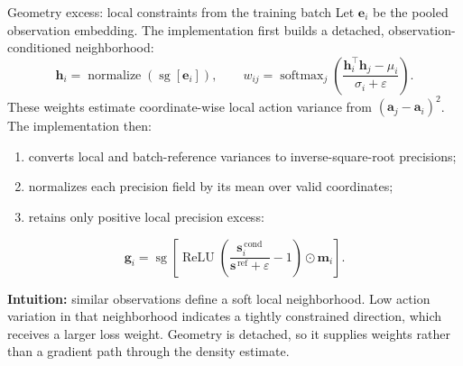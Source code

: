 \documentclass[aspectratio=169,10pt]{beamer}
\newcommand{\vect}[1]{\mathbf{#1}}
\newcommand{\sg}[1]{\operatorname{sg}\!\left[#1\right]}
\begin{document}
\begin{frame}{Geometry excess: local constraints from the training batch}
  \small
  Let $\vect{e}_i$ be the pooled observation embedding. The implementation first
  builds a detached, observation-conditioned neighborhood:
  \[
    \vect{h}_i
      = \operatorname{normalize}(\sg{\vect{e}_i}),
    \qquad
    w_{ij}
      = \operatorname{softmax}_{j}
        \left(
          \frac{\vect{h}_i^\top\vect{h}_j-\mu_i}{\sigma_i+\varepsilon}
        \right).
  \]
  These weights estimate coordinate-wise local action variance from
  $(\vect{a}_j-\vect{a}_i)^2$. The implementation then:
  \begin{enumerate}
    \item converts local and batch-reference variances to inverse-square-root
          precisions;
    \item normalizes each precision field by its mean over valid coordinates;
    \item retains only positive local precision excess:
  \end{enumerate}
  \[
    \vect{g}_i
    =
    \sg{
      \operatorname{ReLU}
      \left(
        \frac{\vect{s}^{\,\mathrm{cond}}_i}
             {\vect{s}^{\,\mathrm{ref}}+\varepsilon}
        -1
      \right)
      \odot\vect{m}_i
    }.
  \]

  \textbf{Intuition:} similar observations define a soft local neighborhood.
  Low action variation in that neighborhood indicates a tightly constrained
  direction, which receives a larger loss weight. Geometry is detached, so it
  supplies weights rather than a gradient path through the density estimate.
\end{frame}
\end{document}
